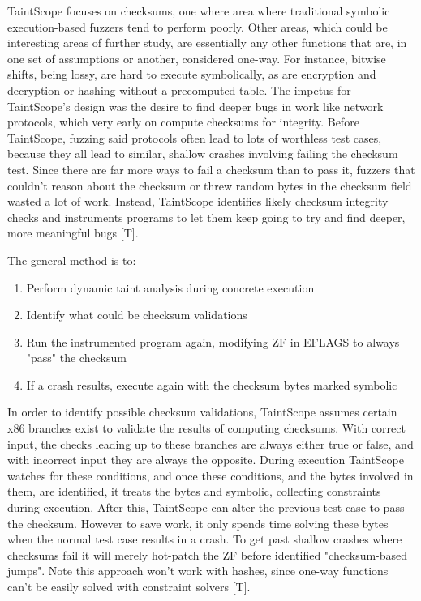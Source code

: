 \documentclass[11pt,expanded,copyright]{fsuthesis}
\begin{document}
TaintScope focuses on checksums, one where area where traditional symbolic execution-based fuzzers tend to perform poorly. Other areas, which could be interesting areas of further study, are essentially any other functions that are, in one set of assumptions or another, considered one-way. For instance, bitwise shifts, being lossy, are hard to execute symbolically, as are encryption and decryption or hashing without a precomputed table. The impetus for TaintScope's design was the desire to find deeper bugs in work like network protocols, which very early on compute checksums for integrity. Before TaintScope, fuzzing said protocols often lead to lots of worthless test cases, because they all lead to similar, shallow crashes involving failing the checksum test. Since there are far more ways to fail a checksum than to pass it, fuzzers that couldn't reason about the checksum or threw random bytes in the checksum field wasted a lot of work. Instead, TaintScope identifies likely checksum integrity checks and instruments programs to let them keep going to try and find deeper, more meaningful bugs [T].

The general method is to:

\begin{enumerate}
	\item Perform dynamic taint analysis during concrete execution
	\item Identify what could be checksum validations
	\item Run the instrumented program again, modifying ZF in EFLAGS to always "pass" the  checksum
	\item If a crash results, execute again with the checksum bytes marked symbolic
\end{enumerate}

In order to identify possible checksum validations, TaintScope assumes certain x86 branches exist to validate the results of computing checksums. With correct input, the checks leading up to these branches are always either true or false, and with incorrect input they are always the opposite. During execution TaintScope watches for these conditions, and once these conditions, and the bytes involved in them, are identified, it treats the bytes and symbolic, collecting constraints during execution. After this, TaintScope can alter the previous test case to pass the checksum. However to save work, it only spends time solving these bytes when the normal test case results in a crash. To get past shallow crashes where checksums fail it will merely hot-patch the ZF before identified "checksum-based jumps". Note this approach won't work with hashes, since one-way functions can't be easily solved with constraint solvers [T].
\end{document}
